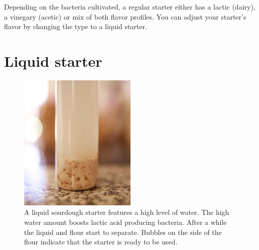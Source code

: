 Depending on the bacteria cultivated, a regular starter either has a lactic (dairy),
a vinegary (acetic) or mix of both flavor profiles. You can adjust your
starter's flavor by changing the type to a liquid starter.

\section{Liquid starter}%
\label{section:liquid-starter}

\begin{figure}[!htb]
\begin{center}
  \includegraphics[width=0.5\textwidth]{sourdough-starter-liquid.jpg}
  \caption[Liquid starter]{A liquid sourdough starter features a high level of
      water. The high water amount boosts lactic acid producing bacteria.
      After a while the liquid and flour start to separate. Bubbles on the
      side of the flour indicate that the starter is ready to be used.}%
  \label{fig:liquid-sourdough-starter}
\end{center}
\end{figure}


\begin{flowchart}[!htb]
\begin{center}
  
  \caption[Converting to a liquid starter]{The process to convert your regular
      or stiff starter into a liquid starter. The whole process takes around 
      3~days. The longer you maintain your starter at the suggested hydration
      level, the more adapted your microorganisms become. It is recommended to
      keep a backup of your original starter as the liquid environment will
      select anaerobic microorganisms. This boosts bacteria that create lactic
      acid rather than acetic acid. The resulting acidity will be perceived as
      milder.}%
  \label{flc:liquid-starter-conversion}
\end{center}
\end{flowchart}

